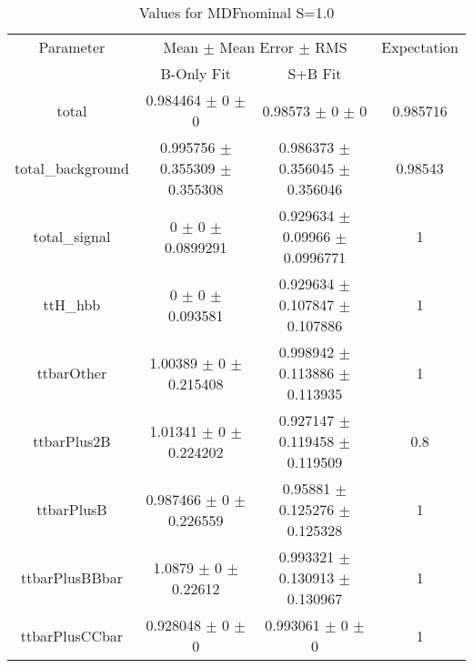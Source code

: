 \begin{table}
\centering
\caption{Values for MDFnominal S=1.0}
\begin{tabular}{cccc}
\toprule
Parameter & \multicolumn{2}{c}{Mean $\pm$ Mean Error $\pm$ RMS} & Expectation\\
 & B-Only Fit & S+B Fit & \\
\midrule
total & \num{0.984464} $\pm$ \num{0} $\pm$ \num{0} & \num{0.98573} $\pm$ \num{0} $\pm$ \num{0} & \num{0.985716}\\
total\_background & \num{0.995756} $\pm$ \num{0.355309} $\pm$ \num{0.355308} & \num{0.986373} $\pm$ \num{0.356045} $\pm$ \num{0.356046} & \num{0.98543}\\
total\_signal & \num{0} $\pm$ \num{0} $\pm$ \num{0.0899291} & \num{0.929634} $\pm$ \num{0.09966} $\pm$ \num{0.0996771} & \num{1}\\
ttH\_hbb & \num{0} $\pm$ \num{0} $\pm$ \num{0.093581} & \num{0.929634} $\pm$ \num{0.107847} $\pm$ \num{0.107886} & \num{1}\\
ttbarOther & \num{1.00389} $\pm$ \num{0} $\pm$ \num{0.215408} & \num{0.998942} $\pm$ \num{0.113886} $\pm$ \num{0.113935} & \num{1}\\
ttbarPlus2B & \num{1.01341} $\pm$ \num{0} $\pm$ \num{0.224202} & \num{0.927147} $\pm$ \num{0.119458} $\pm$ \num{0.119509} & \num{0.8}\\
ttbarPlusB & \num{0.987466} $\pm$ \num{0} $\pm$ \num{0.226559} & \num{0.95881} $\pm$ \num{0.125276} $\pm$ \num{0.125328} & \num{1}\\
ttbarPlusBBbar & \num{1.0879} $\pm$ \num{0} $\pm$ \num{0.22612} & \num{0.993321} $\pm$ \num{0.130913} $\pm$ \num{0.130967} & \num{1}\\
ttbarPlusCCbar & \num{0.928048} $\pm$ \num{0} $\pm$ \num{0} & \num{0.993061} $\pm$ \num{0} $\pm$ \num{0} & \num{1}\\
\bottomrule
\end{tabular}
\end{table}